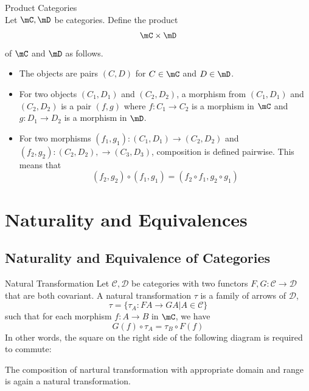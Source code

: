 \documentclass[a4paper]{article}
\begin{document}
\begin{defn}{Product Categories}{}\\
Let $\mC,\mD$ be categories. Define the product $$\mC\times\mD$$ of $\mC$ and $\mD$ as follows. 
\begin{itemize}
\item The objects are pairs $(C,D)$ for $C\in\mC$ and $D\in\mD$. 
\item For two objects $(C_1,D_1)$ and $(C_2,D_2)$, a morphism from $(C_1,D_1)$ and $(C_2,D_2)$ is a pair $(f,g)$ where $f:C_1\to C_2$ is a morphism in $\mC$ and $g:D_1\to D_2$ is a morphism in $\mD$. 
\item For two morphisms $(f_1,g_1):(C_1,D_1)\to(C_2,D_2)$ and $(f_2,g_2):(C_2,D_2),\to(C_3,D_3)$, composition is defined pairwise. This means that $$(f_2,g_2)\circ(f_1,g_1)=(f_2\circ f_1,g_2\circ g_1)$$
\end{itemize}
\end{defn}

\pagebreak
\section{Naturality and Equivalences}
\subsection{Naturality and Equivalence of Categories}
\begin{defn}{Natural Transformation}{} Let $\mathcal{C},\mathcal{D}$ be categories with two functors $F,G:\mathcal{C}\to\mathcal{D}$ that are both covariant. A natural transformation $\tau$ is a family of arrows of $\mathcal{D}$, $$\tau=\{\tau_A:FA\to GA|A\in\mathcal{C}\}$$ such that for each morphism $f:A\to B$ in $\mC$, we have 
$$G(f)\circ\tau_A=\tau_B\circ F(f)$$ In other words, the square on the right side of the following diagram is required to commute: \\
\end{defn}

\begin{prp}{}{} The composition of nartural transformation with appropriate domain and range is again a natural transformation. 
\end{prp}
\end{document}
